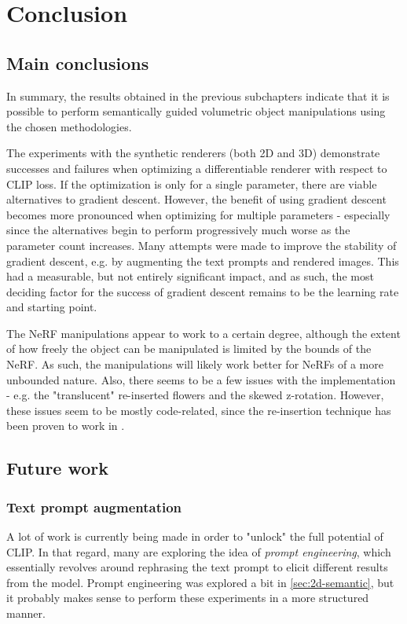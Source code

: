 \chapter{Conclusion}
\label{chapter:conclusion}

\section{Main conclusions}
In summary, the results obtained in the previous subchapters indicate that it is possible to perform semantically guided volumetric object manipulations using the chosen methodologies.

The experiments with the synthetic renderers (both 2D and 3D) demonstrate successes and failures when optimizing a differentiable renderer with respect to CLIP loss. If the optimization is only for a single parameter, there are viable alternatives to gradient descent. However, the benefit of using gradient descent becomes more pronounced when optimizing for multiple parameters - especially since the alternatives begin to perform progressively much worse as the parameter count increases. Many attempts were made to improve the stability of gradient descent, e.g. by augmenting the text prompts and rendered images. This had a measurable, but not entirely significant impact, and as such, the most deciding factor for the success of gradient descent remains to be the learning rate and starting point.

The NeRF manipulations appear to work to a certain degree, although the extent of how freely the object can be manipulated is limited by the bounds of the NeRF. As such, the manipulations will likely work better for NeRFs of a more unbounded nature. Also, there seems to be a few issues with the implementation - e.g. the "translucent" re-inserted flowers and the skewed z-rotation. However, these issues seem to be mostly code-related, since the re-insertion technique has been proven to work in \cite{benaim2022}.

\section{Future work}
\subsection{Text prompt augmentation}
A lot of work is currently being made in order to "unlock" the full potential of CLIP. In that regard, many are exploring the idea of \textit{prompt engineering}, which essentially revolves around rephrasing the text prompt to elicit different results from the model. Prompt engineering was explored a bit in \ref{sec:2d-semantic}, but it probably makes sense to perform these experiments in a more structured manner. 

